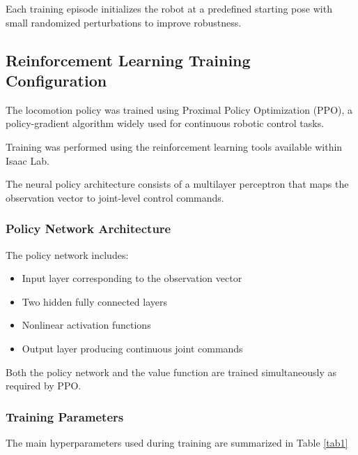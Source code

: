 \documentclass[pdflatex,sn-mathphys-num]{sn-jnl}%
\theoremstyle{thmstyleone}%
\theoremstyle{thmstyletwo}%
\theoremstyle{thmstylethree}%
\begin{document}
Each training episode initializes the robot at a predefined starting pose with small randomized perturbations to improve robustness.

\subsection{Reinforcement Learning Training Configuration}
The locomotion policy was trained using Proximal Policy Optimization (PPO), a policy-gradient algorithm widely used for continuous robotic control tasks.

Training was performed using the reinforcement learning tools available within Isaac Lab.

The neural policy architecture consists of a multilayer perceptron that maps the observation vector to joint-level control commands.

\subsubsection{Policy Network Architecture}
The policy network includes:
\begin{itemize}
    \item Input layer corresponding to the observation vector
    \item Two hidden fully connected layers
    \item Nonlinear activation functions
    \item Output layer producing continuous joint commands
\end{itemize}

Both the policy network and the value function are trained simultaneously as required by PPO.

\subsubsection{Training Parameters}
The main hyperparameters used during training are summarized in Table \ref{tab1}
\end{document}
